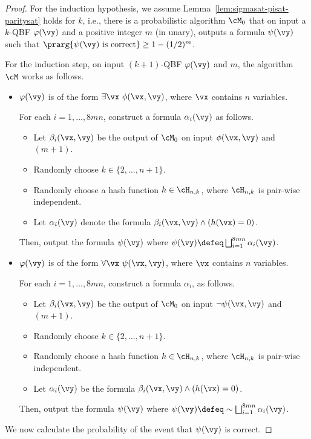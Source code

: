 \documentclass[11pt, a4paper]{article}
\begin{document}
\begin{proof}
For the induction hypothesis, we assume Lemma~\ref{lem:sigmasat-pisat-paritysat} holds for $k$, i.e.,
there is a probabilistic algorithm $\cM_0$ that
on input a $k$-QBF $\varphi(\vy)$ and a positive integer $m$ (in unary),
outputs a formula $\psi(\vy)$ such that 
$\prarg {\psi(\vy) \ \text{is correct}}\geq 1-(1/2)^m$.

For the induction step, 
on input $(k+1)$-QBF $\varphi(\vy)$ and $m$,
the algorithm $\cM$ works as follows.
\begin{itemize}
\item
$\varphi(\vy)$ is of the form $\exists\vx\ \phi(\vx,\vy)$,
where $\vx$ contains $n$ variables.

For each $i=1,\ldots,8mn$, construct a formula $\alpha_i(\vy)$ as follows.
\begin{itemize}
\item
Let $\beta_i(\vx,\vy)$ be the output of $\cM_0$ on input $\phi(\vx,\vy)$ and $(m+1)$.
\item
Randomly choose $k \in \{2,\ldots,n+1\}$.
\item 
Randomly choose a hash function $h\in \cH_{n,k}$, where $\cH_{n,k}$ is pair-wise independent.
\item 
Let $\alpha_i(\vy)$ denote the formula $\beta_i(\vx,\vy) \wedge (h(\vx)=0)$.
\end{itemize}
Then, output the formula $\psi(\vy)$ where $\psi(\vy)\defeq\bigsqcup_{i=1}^{8mn} \alpha_i(\vy)$.


\item
$\varphi(\vy)$ is of the form $\forall\vx\ \psi(\vx,\vy)$,
where $\vx$ contains $n$ variables.

For each $i=1,\ldots,8mn$, construct a formula $\alpha_i$,  as follows.
\begin{itemize}
\item
Let $\beta_i(\vx,\vy)$ be the output of $\cM_0$ on input $\neg\psi(\vx,\vy)$ and $(m+1)$.
\item
Randomly choose $k \in \{2,\ldots,n+1\}$.
\item 
Randomly choose a hash function $h\in \cH_{n,k}$, where $\cH_{n,k}$ is pair-wise independent.
\item 
Let $\alpha_i(\vy)$ be the formula $\beta_i(\vx,\vy) \wedge (h(\vx)=0)$.
\end{itemize}
Then, output the formula $\psi(\vy)$ where $\psi(\vy)\defeq\sim\bigsqcup_{i=1}^{8mn} \alpha_i(\vy)$.

\end{itemize}
We now calculate the probability of the event that $\psi(\vy)$ is correct.


\end{proof}
\end{document}
